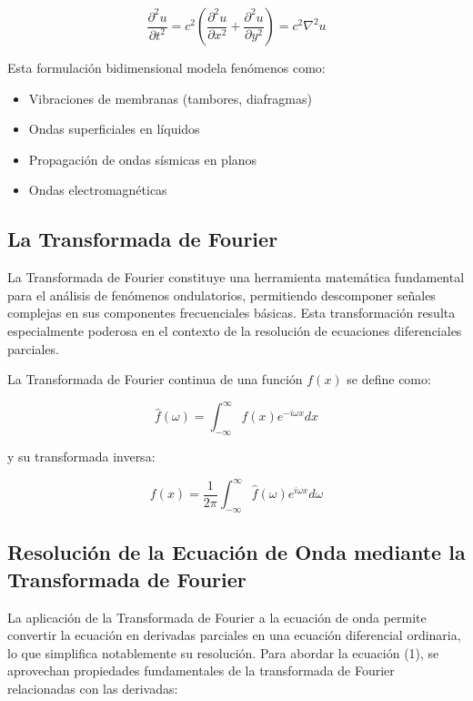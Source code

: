 \documentclass[a4paper]{article}
\begin{document}
\begin{equation}
    \frac{\partial^2 u}{\partial t^2} = c^2 \left(\frac{\partial^2 u}{\partial x^2} + \frac{\partial^2 u}{\partial y^2}\right) = c^2 \nabla^2 u
\end{equation}

Esta formulación bidimensional modela fenómenos como:

\begin{itemize}
    \item Vibraciones de membranas (tambores, diafragmas)
    \item Ondas superficiales en líquidos
    \item Propagación de ondas sísmicas en planos
    \item Ondas electromagnéticas
\end{itemize}

\subsection{La Transformada de Fourier}

La Transformada de Fourier constituye una herramienta matemática fundamental para el análisis de fenómenos ondulatorios, permitiendo
descomponer señales complejas en sus componentes frecuenciales básicas. Esta transformación resulta especialmente poderosa en el
contexto de la resolución de ecuaciones diferenciales parciales.

La Transformada de Fourier continua de una función $f(x)$ se define como:

\begin{equation}
    \hat{f}(\omega) = \int_{-\infty}^{\infty} f(x) e^{-i\omega x} dx
\end{equation}

y su transformada inversa:

\begin{equation}
    f(x) = \frac{1}{2\pi} \int_{-\infty}^{\infty} \hat{f}(\omega) e^{i\omega x} d\omega
\end{equation}


\subsection{Resolución de la Ecuación de Onda mediante la Transformada de Fourier}

La aplicación de la Transformada de Fourier a la ecuación de onda permite convertir la ecuación en derivadas parciales en una ecuación diferencial ordinaria,
lo que simplifica notablemente su resolución. Para abordar la ecuación (1), se aprovechan propiedades fundamentales de la transformada de Fourier relacionadas con las derivadas:
\end{document}
